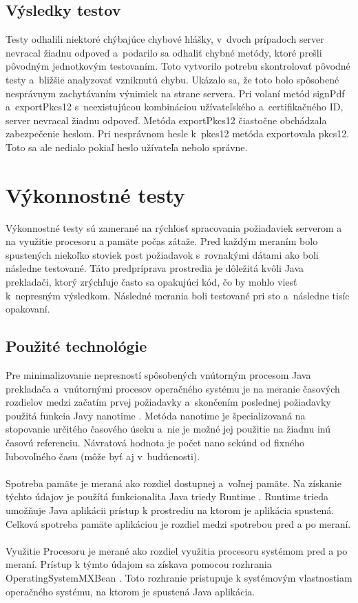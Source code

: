 \documentclass[
  digital, %
  table,   %
oneside,
  nolof,     %
  nolot,     %
]{fithesis3}
\begin{document}
\subsection{Výsledky testov}
Testy odhalili niektoré chýbajúce chybové hlášky, v~dvoch prípadoch server nevracal žiadnu odpoveď a~podarilo sa odhaliť chybné metódy, ktoré prešli pôvodným jednotkovým testovaním.
Toto vytvorilo potrebu skontrolovať pôvodné testy a~bližšie analyzovať vzniknutú chybu. Ukázalo sa, že toto bolo spôsobené nesprávnym zachytávaním výnimiek na strane servera.
Pri volaní metód signPdf a~exportPkcs12 s~neexistujúcou kombináciou užívateľského a~certifikačného ID, server nevracal žiadnu odpoveď. Metóda exportPkcs12 čiastočne obchádzala zabezpečenie heslom. Pri nesprávnom hesle k~pkcs12 metóda exportovala pkcs12. Toto sa ale nedialo pokiaľ heslo užívateľa nebolo správne.
\section{Výkonnostné testy}
Výkonnostné testy sú zamerané na rýchlosť spracovania požiadaviek serverom a na využitie procesoru a pamäte počas zátaže.
Pred každým meraním bolo spustených niekoľko stoviek post požiadavok s~rovnakými dátami ako boli následne testované. Táto predpríprava prostredia je dôležitá kvôli Java prekladači, ktorý zrýchľuje často sa opakujúci kód, čo by mohlo viesť k~nepresným výsledkom. Následné merania boli  testované pri sto a~následne tisíc opakovaní.
\subsection{Použité technológie}
Pre minimalizovanie nepresností spôsobených vnútorným procesom Java prekladača a~vnútornými procesov operačného systému je na meranie časových rozdielov medzi začatím prvej požiadavky a~skončením poslednej požiadavky použitá funkcia Javy nanotime \cite{systemNanotime}. Metóda nanotime je špecializovaná na stopovanie určitého časového úseku a~nie je možné jej použitie na žiadnu inú časovú referenciu. Návratová hodnota je počet nano sekúnd od fixného ľubovoľného času (môže byť aj v~budúcnosti).
\paragraph{}
Spotreba pamäte je meraná ako rozdiel dostupnej a~voľnej pamäte. Na získanie týchto údajov je použítá funkcionalita Java triedy Runtime \cite{runtime}. Runtime trieda umožňuje Java aplikácii prístup k prostrediu na ktorom je aplikácia spustená. Celková spotreba pamäte aplikáciou je rozdiel medzi spotrebou pred a po meraní. \paragraph{}
Využitie Procesoru je merané ako rozdiel využitia procesoru systémom pred a po meraní. Prístup k týmto údajom sa získava pomocou rozhrania OperatingSystemMXBean \cite{mxBean}. Toto rozhranie pristupuje k systémovým vlastnostiam operačného systému, na ktorom je spustená Java aplikácia.  
\end{document}
